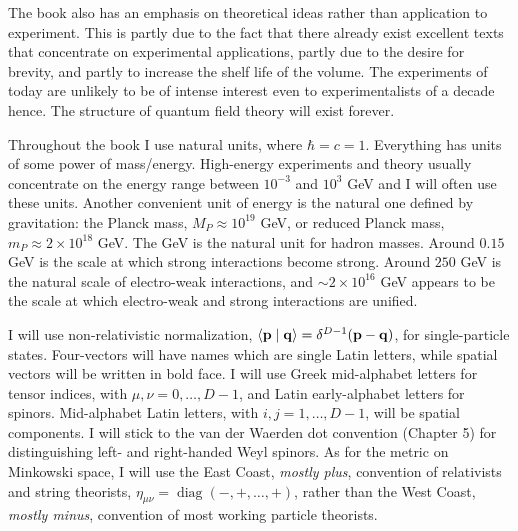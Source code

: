 The book also has an emphasis on theoretical ideas rather than application to
experiment.  This is partly due to the fact that there already exist excellent
texts that concentrate on experimental applications, partly due to the desire
for brevity, and partly to increase
the shelf life of the volume.  The experiments of today are unlikely to be of
intense interest even to experimentalists of a decade hence.  The structure of
quantum field theory will exist forever.

Throughout the book I use natural units, where \(\hbar=c=1\).  Everything has
units of some power of mass/energy.  High-energy experiments and theory usually
concentrate on the energy range between \(10^{-3}\) and \(10^{3}\) GeV and I will
often use these units.  Another convenient unit of energy is the natural one
defined by gravitation: the Planck mass, \(M_P\approx10^{19}\) GeV, or reduced
Planck mass, \(m_P\approx2\times10^{18}\) GeV.  The GeV is the natural unit for
hadron masses.  Around \(0.15\) GeV is the scale at which strong interactions
become strong.  Around \(250\) GeV is the natural scale of electro-weak
interactions, and \(\sim2\times10^{16}\) GeV appears to be the scale at which
electro-weak and strong interactions are unified.

I will use non-relativistic normalization, \(\langle \mathbf p\mid \mathbf q\rangle=\delta^{D-1}(\mathbf p-\mathbf q)\), for
single-particle states.  Four-vectors will have names which are single Latin
letters, while spatial vectors will be written in bold face.  I will use Greek
mid-alphabet letters for tensor indices, with \(\mu,\nu=0,\ldots,D-1\), and Latin early-alphabet letters for
spinors.  Mid-alphabet Latin letters, with \(i,j=1,\ldots,D-1\), will be spatial components.  I will
stick to the van der Waerden dot convention (Chapter 5) for distinguishing
left- and right-handed Weyl spinors.  As for the metric on Minkowski space, I
will use the East Coast, \emph{mostly plus}, convention of relativists and string
theorists, \(\eta_{\mu\nu}=\operatorname{diag}(-,+,\ldots,+)\), rather than the West
Coast, \emph{mostly minus}, convention of most working particle theorists.


